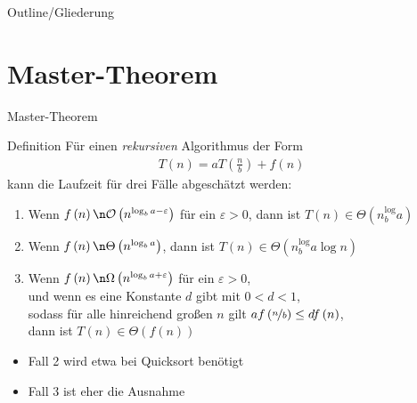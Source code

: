 
\subtitle{Foliensatz 10}
\date{10. Januar 2013}



\begin{frame}
    \titlepage
\end{frame}

\begin{frame}{Outline/Gliederung}
    \tableofcontents
\end{frame}

\section{Master-Theorem}
\begin{frame}{Master-Theorem}
    \begin{block}{Definition}
        Für einen \emph{rekursiven} Algorithmus der Form
        \begin{align*}
            T\left( n \right) = aT\left( \frac{n}{b} \right) + f\left( n \right)
        \end{align*}
        kann die Laufzeit für drei Fälle abgeschätzt werden:
        \pause
        \begin{enumerate}
            \item Wenn $f\left( n \right)\n \mathcal{O}\left( n^{\log_b a-\varepsilon} \right)$ für ein $\varepsilon > 0$, dann ist $T\left( n \right) \in \Theta\left( n^\log_b a \right)$
                \pause
            \item Wenn $f\left( n \right)\n \Theta\left( n^{\log_b a} \right)$, dann ist $T\left( n \right) \in \Theta\left( n^\log_b a \log n\right)$
                \pause
            \item Wenn $f\left( n \right)\n \Omega\left( n^{\log_b a+\varepsilon} \right)$ für ein $\varepsilon > 0$, \\ und wenn es eine Konstante $d$ gibt mit $0<d<1$,\\ sodass für alle hinreichend großen $n$ gilt $af\left( \nicefrac{n}{b} \right) \leq df\left( n \right)$,\\ dann ist $T\left( n \right) \in \Theta\left( f\left( n \right) \right)$
        \end{enumerate}
    \end{block}
    \begin{itemize}
        \item Fall 2 wird etwa bei Quicksort benötigt
        \item Fall 3 ist eher die Ausnahme
    \end{itemize}
\end{frame}

